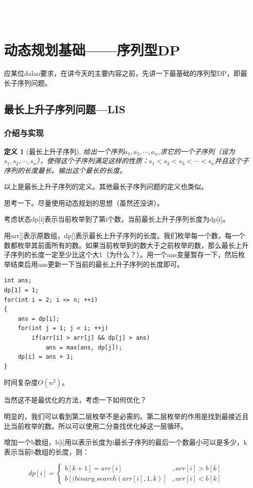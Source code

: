 \documentclass{article}
\newtheorem{definition}{定义}[subsection]
\theoremstyle{nonumberplain}
\begin{document}
\textcolor{white}{希望大家不要放弃，OIer这个群体很是特殊，并且饱受排挤，大家一定坚持下去，不管外界怎么看待我们，一定要记住自己的目标。不忘初心，方得始终。}
\newpage
\section{动态规划基础------序列型DP}
应某位dalao要求，在讲今天的主要内容之前，先讲一下最基础的序列型DP，即最长子序列问题。
\subsection{最长上升子序列问题---LIS}
\subsubsection{介绍与实现}
\begin{definition}[最长上升子序列]
	给出一个序列$a_1, a_2, \cdots, a_n$,求它的一个子序列（设为$s_1, s_2, \cdots, s_n$），使得这个子序列满足这样的性质：$s_1<s_2<s_3<\cdots<s_n$并且这个子序列的长度最长。输出这个最长的长度。
\end{definition}

以上是最长上升子序列的定义。其他最长子序列问题的定义也类似。

思考一下。尽量使用动态规划的思想（虽然还没讲）。

考虑状态dp[i]表示当前枚举到了第i个数，当前最长上升子序列长度为dp[i]。

用arr[]表示原数组，dp[]表示最长上升子序列的长度。我们枚举每一个数，每一个数都枚举其前面所有的数。如果当前枚举到的数大于之前枚举的数，那么最长上升子序列的长度一定至少比这个大1（为什么？）。用一个ans变量暂存一下，然后枚举结束后用ans更新一下当前的最长上升子序列的长度即可。
\begin{verbatim}
int ans;  
dp[1] = 1;  
for(int i = 2; i <= n; ++i)  
{
    ans = dp[i];  
    for(int j = 1; j < i; ++j)
        if(arr[i] > arr[j] && dp[j] > ans)  
            ans = max(ans, dp[j]);  
    dp[i] = ans + 1;
}
\end{verbatim}

时间复杂度$O(n^2)$。

当然这不是最优化的方法，考虑一下如何优化？

明显的，我们可以看到第二层枚举不是必需的。第二层枚举的作用是找到最接近且比当前枚举的数。所以可以使用二分查找优化掉这一层循环。

增加一个b数组，b[i]用以表示长度为i最长子序列的最后一个数最小可以是多少，k表示当前b数组的长度，则：

\begin{equation*}
	dp[i]=\left\{\begin{matrix}
		b[k+1]=arr[i]                  & , arr[i]>b[k] \\
		b[(binary\_search(arr[i],1,k)] & , arr[i]<b[k]
	\end{matrix}\right.
\end{equation*}
\end{document}
